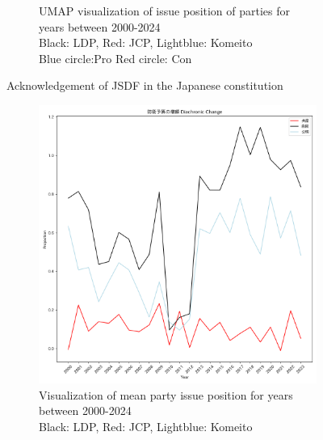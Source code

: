 \documentclass[final,5p,times,twocolumn,authoryear]{elsarticle}
\begin{document}
\begin{figure}[h]
\begin{subfigure}{0.48\textwidth}
		  \caption{UMAP visualization of issue position of parties for years between 2000-2024 \\\hspace{\textwidth} 
		  Black: LDP, Red: JCP, Lightblue: Komeito\\\hspace{\textwidth}
		  Blue circle:Pro Red circle: Con}
		  \label{fig:sub2}
		\end{subfigure}
	\caption{Acknowledgement of JSDF in the Japanese constitution}
	\label{fig: results-diachronic-defence-constitution}
\end{figure}

\begin{figure}[h]
	\centering
		\begin{subfigure}{0.48\textwidth}
		  \centering
		  \includegraphics[width=\textwidth]{figs/results/diachronic_defence/defencebudget_diachronic_change.png}
		  \caption{Visualization of mean party issue position for years between 2000-2024 \\\hspace{\textwidth} Black: LDP, Red: JCP, Lightblue: Komeito}
		  \label{fig:sub1}
		\end{subfigure}
		\hfill
		\begin{subfigure}{0.48\textwidth}
		  \centering

\end{subfigure}
\end{figure}
\end{document}
